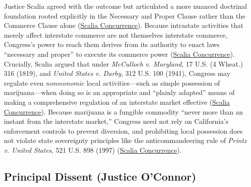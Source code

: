 \documentclass[12pt]{article}
\begin{document}
Justice Scalia agreed with the outcome but articulated a more nuanced doctrinal foundation rooted explicitly in the Necessary and Proper Clause rather than the Commerce Clause alone (\href{https://www.law.cornell.edu/supct/html/03-1454.ZC.html}{Scalia Concurrence}). Because intrastate activities that merely affect interstate commerce are not themselves interstate commerce, Congress's power to reach them derives from its authority to enact laws ``necessary and proper'' to execute its commerce power (\href{https://www.law.cornell.edu/supct/html/03-1454.ZC.html}{Scalia Concurrence}). Crucially, Scalia argued that under \textit{McCulloch v. Maryland}, 17 U.S. (4 Wheat.) 316 (1819), and \textit{United States v. Darby}, 312 U.S. 100 (1941), Congress may regulate even \textit{noneconomic} local activities---such as simple possession of marijuana---when doing so is an appropriate and ``plainly adapted'' means of making a comprehensive regulation of an interstate market effective (\href{https://www.law.cornell.edu/supct/html/03-1454.ZC.html}{Scalia Concurrence}). Because marijuana is a fungible commodity ``never more than an instant from the interstate market,'' Congress need not rely on California's enforcement controls to prevent diversion, and prohibiting local possession does not violate state sovereignty principles like the anticommandeering rule of \textit{Printz v. United States}, 521 U.S. 898 (1997) (\href{https://www.law.cornell.edu/supct/html/03-1454.ZC.html}{Scalia Concurrence}).

\subsection{Principal Dissent (Justice O'Connor)}
\end{document}
